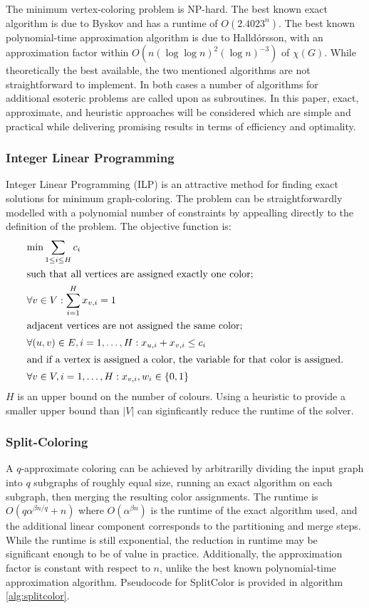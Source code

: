 \documentclass[twocolumn]{article}
\begin{document}
The minimum vertex-coloring problem is NP-hard. The best known exact algorithm is due to Byskov and has a runtime of $O(2.4023^n)$. The best known polynomial-time approximation algorithm is due to Halldórsson, with an approximation factor within $O(n(\log \log n)^2 (\log n)^{-3})$ of $\chi(G)$. While theoretically the best available, the two mentioned algorithms are not straightforward to implement. In both cases a number of algorithms for additional esoteric problems are called upon as subroutines. In this paper, exact, approximate, and heuristic approaches will be considered which are simple and practical while delivering promising results in terms of efficiency and optimality.

\subsubsection{Integer Linear Programming}
\label{sec:ilp2}
Integer Linear Programming (ILP) is an attractive method for finding exact solutions for minimum graph-coloring. The problem can be straightforwardly modelled with a polynomial number of constraints by appealling directly to the definition of the problem. The objective function is:
\begin{align}
	&\text{min} \sum_{1 \leq i \leq H} c_i \\
	\intertext{such that all vertices are assigned exactly one color;}
	&\forall v \in V : \sum_{i = 1}^{H} x_{v, i} = 1 \\
	\intertext{adjacent vertices are not assigned the same color;}
	&\forall (u, v) \in E, i = 1, \dots, H : x_{u, i} + x_{v, i} \leq c_i \\
	\intertext{and if a vertex is assigned a color, the variable for that color is assigned.}
	&\forall v \in V, i = 1, \dots, H : x_{v, i}, w_i \in \{ 0, 1 \}
\end{align}
$H$ is an upper bound on the number of colours. Using a heuristic to provide a smaller upper bound than $|V|$ can siginficantly reduce the runtime of the solver.


\subsubsection{Split-Coloring}
\label{sec:splitcolor2}
A $q$-approximate coloring can be achieved by arbitrarilly dividing the input graph into $q$ subgraphs of roughly equal size, running an exact algorithm on each subgraph, then merging the resulting color assignments. The runtime is $O(q\alpha^{\beta n / q} + n)$ where $O(\alpha^{\beta n})$ is the runtime of the exact algorithm used, and the additional linear component corresponds to the partitioning and merge steps. While the runtime is still exponential, the reduction in runtime may be significant enough to be of value in practice. Additionally, the approximation factor is constant with respect to $n$, unlike the best known polynomial-time approximation algorithm. Pseudocode for SplitColor is provided in algorithm \ref{alg:splitcolor}.
\end{document}
